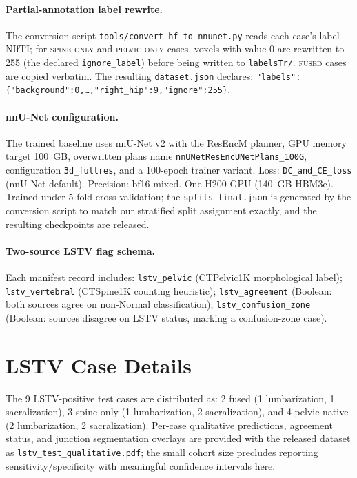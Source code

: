 \documentclass[pmlr]{jmlr}
\begin{document}
\paragraph{Partial-annotation label rewrite.}
The conversion script \texttt{tools/convert\_hf\_to\_nnunet.py}
reads each case's label NIfTI; for
\textsc{spine-only} and \textsc{pelvic-only} cases, voxels with
value 0 are rewritten to 255 (the declared \texttt{ignore\_label})
before being written to \texttt{labelsTr/}.
\textsc{fused} cases are copied verbatim. The resulting
\texttt{dataset.json} declares:
\texttt{"labels":\{"background":0,\dots,"right\_hip":9,"ignore":255\}}.

\paragraph{nnU-Net configuration.}
The trained baseline uses nnU-Net v2
with the ResEncM planner, GPU memory target 100~GB, overwritten
plans name \texttt{nnUNetResEncUNetPlans\_100G}, configuration
\texttt{3d\_fullres}, and a 100-epoch trainer variant.
Loss: \texttt{DC\_and\_CE\_loss} (nnU-Net default). Precision: bf16
mixed. One H200 GPU (140~GB HBM3e). Trained under 5-fold
cross-validation; the \texttt{splits\_final.json} is generated by
the conversion script to match our stratified split assignment
exactly, and the resulting checkpoints are released.

\paragraph{Two-source LSTV flag schema.}
Each manifest record includes:
\texttt{lstv\_pelvic} (CTPelvic1K morphological label);
\texttt{lstv\_vertebral} (CTSpine1K counting heuristic);
\texttt{lstv\_agreement} (Boolean: both sources agree on non-Normal
classification);
\texttt{lstv\_confusion\_zone} (Boolean: sources disagree on LSTV
status, marking a confusion-zone case).

\section{LSTV Case Details}
\label{app:lstv_cases}

The 9 LSTV-positive test cases are distributed as:
2 fused (1 lumbarization, 1 sacralization), 3 spine-only
(1 lumbarization, 2 sacralization), and 4 pelvic-native
(2 lumbarization, 2 sacralization).
Per-case qualitative predictions, agreement status, and junction
segmentation overlays are provided with the released dataset as
\texttt{lstv\_test\_qualitative.pdf}; the small cohort size
precludes reporting sensitivity/specificity with meaningful
confidence intervals here.
\end{document}

